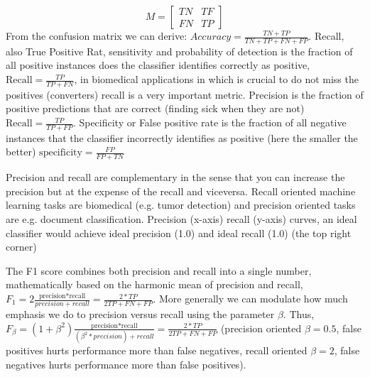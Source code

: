 \documentclass[11pt]{article}
\begin{document}
\[
M=
  \begin{bmatrix}
    TN & TF  \\
    FN & TP 
  \end{bmatrix}
\]
From the confusion matrix we can derive:
$\textit{Accuracy} = \frac{TN + TP}{TN+TP+FN+FP}$. 
Recall, also True Positive Rat, sensitivity and probability of detection  is the fraction of all positive instances does the classifier identifies correctly as positive, $\text{Recall} = \frac{TP}{TP+FN}$, in biomedical applications in which is crucial to do not miss the positives (converters) recall is a very important metric.
Precision is the fraction of positive predictions that are correct (finding sick when they are not) $\text{Recall} = \frac{TP}{TP+FP}$.
Specificity or False positive rate is the fraction of all negative instances that the classifier incorrectly identifies as positive (here the smaller the better)  $\text{specificity} = \frac{FP}{FP+TN}$

Precision and recall are complementary in the sense that you can increase the precision but at the expense of the recall and viceversa. Recall oriented machine learning tasks are biomedical (e.g. tumor detection) and precision oriented tasks are e.g. document classification. Precision (x-axis) recall (y-axis) curves, an ideal classifier would achieve ideal precision (1.0) and ideal recall (1.0) (the top right corner) 

The F1 score combines both precision and recall into a single number, mathematically based on the harmonic mean of precision and recall, $F_1 = 2\frac{\text{precision*recall}}{precision+recall} = \frac{2 * TP}{2TP + FN + FP}$. More generally we can modulate how much emphasis we do to precision versus recall using the parameter $\beta$. Thus, $F_\beta = (1+\beta^2)\frac{\text{precision*recall}}{(\beta^2 * precision)+recall} = \frac{2 * TP}{2TP + FN + FP}$ (precision oriented $\beta=0.5$, false positives hurts performance more than false negatives, recall oriented $\beta=2$, false negatives hurts performance more than false positives).
\end{document}
